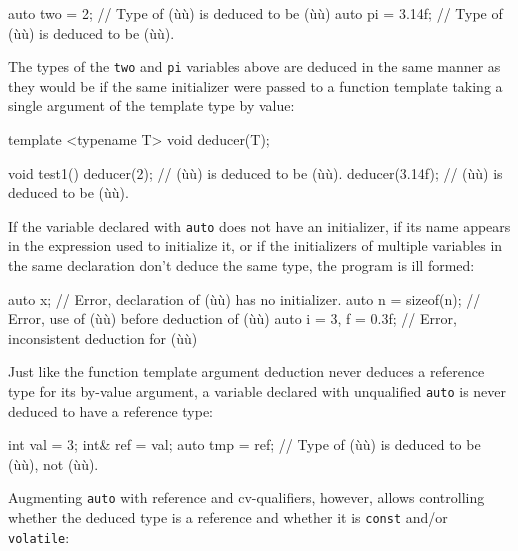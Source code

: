 \begin{emcppslisting}
auto two = 2;     // Type of (ù{}ù) is deduced to be (ù{}ù)
auto pi = 3.14f;  // Type of (ù{}ù) is deduced to be (ù{}ù).
\end{emcppslisting}
    
\noindent The types of the \lstinline!two! and \lstinline!pi! variables above are
deduced in the same manner as they would be if the same initializer were
passed to a function template taking a single argument of the template
type by value:

\begin{emcppslisting}
template <typename T> void deducer(T);

void test1()
{
    deducer(2);      // (ù{}ù) is deduced to be (ù{}ù).
    deducer(3.14f);  // (ù{}ù) is deduced to be (ù{}ù).
}
\end{emcppslisting}
    
\noindent If the variable declared with \lstinline!auto! does not have an
initializer, if its name appears in the expression used to initialize
it, or if the initializers of multiple variables in the same declaration
don't deduce the same type, the program is ill formed:

\begin{emcppslisting}
auto x;                // Error, declaration of (ù{}ù) has no initializer.
auto n = sizeof(n);    // Error, use of (ù{}ù) before deduction of (ù{}ù)
auto i = 3, f = 0.3f;  // Error, inconsistent deduction for (ù{}ù)
\end{emcppslisting}
    
\noindent Just like the function template argument deduction never deduces a
reference type for its by-value argument, a variable declared with
unqualified \lstinline!auto! is never deduced to have a reference type:

\begin{emcppslisting}
int  val = 3;
int& ref = val;
auto tmp = ref;  // Type of (ù{}ù) is deduced to be (ù{}ù), not (ù{}ù).
\end{emcppslisting}
    
\noindent Augmenting \lstinline!auto! with reference and cv-qualifiers, however,
allows controlling whether the deduced type is a reference and whether
it is \lstinline!const! and/or \lstinline!volatile!:

